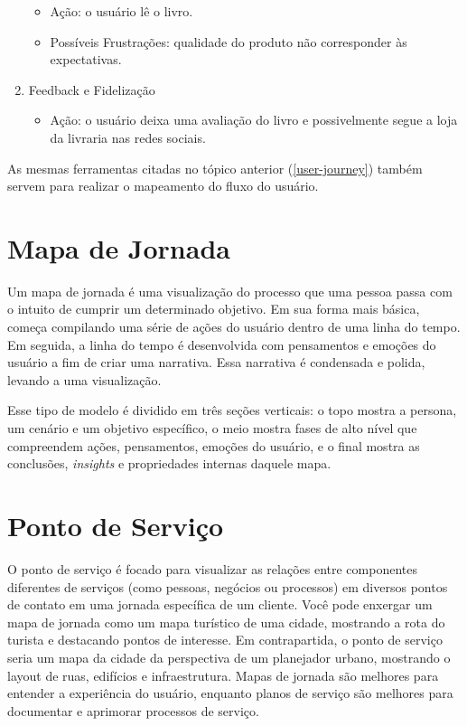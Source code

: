 \documentclass[
  12pt,
  openright,
  twoside,
  a4paper,
  english,
  french,
  spanish,
  brazil
]{abntex2}
\begin{document}
\begin{enumerate}
  \begin{itemize}
    \item Ação: o usuário lê o livro.
    \item
      Possíveis Frustrações: qualidade do produto não corresponder às
      expectativas.
  \end{itemize}
  \item Feedback e Fidelização
  \begin{itemize}
    \item
      Ação: o usuário deixa uma avaliação do livro e possivelmente segue a loja
      da livraria nas redes sociais.
  \end{itemize}
\end{enumerate}

As mesmas ferramentas citadas no tópico anterior (\ref{user-journey}) também
servem para realizar o mapeamento do fluxo do usuário.

\section{Mapa de Jornada}

Um mapa de jornada é uma visualização do processo que uma pessoa passa com o
intuito de cumprir um determinado objetivo. Em sua forma mais básica, começa
compilando uma série de ações do usuário dentro de uma linha do tempo. Em
seguida, a linha do tempo é desenvolvida com pensamentos e emoções do usuário a
fim de criar uma narrativa. Essa narrativa é condensada e polida, levando a uma
visualização.

Esse tipo de modelo é dividido em três seções verticais: o topo mostra a
persona, um cenário e um objetivo específico, o meio mostra fases de alto nível
que compreendem ações, pensamentos, emoções do usuário, e o final mostra as
conclusões, \textit{insights} e propriedades internas daquele mapa.

\section{Ponto de Serviço}

O ponto de serviço é focado para visualizar as relações entre componentes
diferentes de serviços (como pessoas, negócios ou processos) em diversos pontos
de contato em uma jornada específica de um cliente. Você pode enxergar um mapa
de jornada como um mapa turístico de uma cidade, mostrando a rota do turista e
destacando pontos de interesse. Em contrapartida, o ponto de serviço seria um
mapa da cidade da perspectiva de um planejador urbano, mostrando o layout de
ruas, edifícios e infraestrutura. Mapas de jornada são melhores para entender a
experiência do usuário, enquanto planos de serviço são melhores para documentar
e aprimorar processos de serviço.
\end{document}
